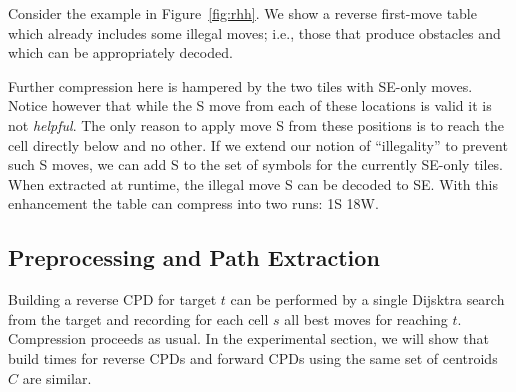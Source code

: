 \begin{example}
Consider the example in Figure~\ref{fig:rhh}. 
We show a reverse first-move table which already includes some illegal moves; i.e., those
that produce obstacles and which can be appropriately decoded.


Further compression here is hampered by the two tiles with SE-only moves.
Notice however that while the S move from each of these locations is valid
it is not \emph{helpful}.  
The only reason to apply move S from these positions is to reach the 
cell directly below and no other. 
If we extend our notion of ``illegality'' to prevent such S moves, 
we can add S to the set of symbols for the currently SE-only tiles. 
When extracted at runtime, the illegal move S can be decoded to SE. 
With this enhancement the table can compress into two runs: 1S 18W.
\end{example}

\subsection{Preprocessing and Path Extraction}
Building a reverse CPD for target $t$ can be performed by a single
Dijsktra search from the target and recording for each cell $s$ all best
moves for reaching $t$.  Compression proceeds as usual.
In the experimental section, we will show that build times for reverse CPDs 
and forward CPDs using the same set of centroids $C$ are similar.

